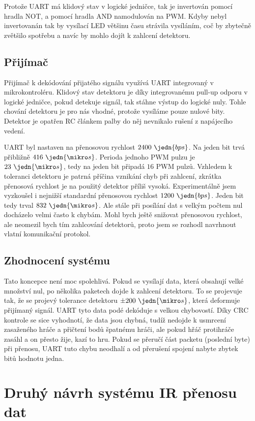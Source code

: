 Protože UART má klidový stav v logické jedničce, tak je invertován pomocí hradla NOT, a pomocí hradla AND namodulován na PWM. Kdyby nebyl invertovanán tak by vysílací LED většinu času strávila vysíláním, coč by zbytečně zvětšilo spotřebu a navíc by mohlo dojít k zahlcení detektoru.

\subsection{Přijímač}
Přijímač k dekódování přijatého signálu využívá UART integrovaný v mikrokontroléru. Klidový stav detektoru je díky integrovanému pull-up odporu v logické jedničce, pokud detekuje signál, tak stáhne výstup do logické nuly. Tohle chování detektoru je pro nás vhodné, protože vysíláme pouze nulové bity. Detektor je opatřen RC článkem palby do něj nevnikalo rušení z napájecího vedení.

UART byl nastaven na přenosovou rychlost $2400~\jedn{bps}$. Na jeden bit trvá přibližně $416~\jedn{\mikro s}$. Perioda jednoho PWM pulzu je $23~\jedn{\mikro s}$, tedy na jeden bit připadá $16$ PWM pulzů. Vzhledem k toleranci detektoru je patrná příčina vznikání chyb při zahlcení, zkrátka přenosová rychlost je na použitý detektor příliš vysoká. Experimentálně jsem vyzkoušel i nejnižší standardní přenosovou rychlost $1200~\jedn{bps}$. Jeden bit tedy trval $832~\jedn{\mikro s}$. Ale stále při posílání dat s velkým počtem nul docházelo velmi často k chybám. Mohl bych ještě snižovat přenosovou rychlost, ale neomezil bych tím zahlcování detektorů, proto jsem se rozhodl navrhnout vlatní komunikační protokol.

\subsection{Zhodnocení systému}
Tato koncepce není moc spolehlivá. Pokud se vysílají data, která obsahují velké množství nul, po několika paketech dojde k zahlcení detektoru. To se projevuje tak, že se projevý tolerance detektoru $\pm200~\jedn{\mikro s}$, která deformuje přijímaný signál. UART tyto data podé dekóduje s velkou chybovostí. Díky CRC kontrole se sice vyhodnotí, že data jsou chybná, tudíž nedojde k usmrcení zasaženého hráče a přičtení bodů špatnému hráči, ale pokud hřáč protihráče zasáhl a on přesto žije, kazí to hru. Pokud se přeručí část packetu (poslední byte) při přenosu, UART tuto chybu neodhalí a od přerušení spojení nabyte zbytek bitů hodnotu jedna.


\section{Druhý návrh systému IR přenosu dat}

